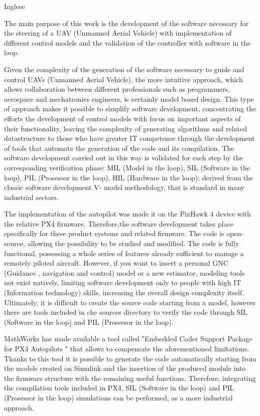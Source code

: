 \begin{commento}
Inglese

The main purpose of this work is the development of the software necessary for the steering of a UAV (Unmanned Aerial Vehicle) with implementation of different control models and  the validation of the controller with software in the loop.

Given the complexity of the generation of the software necessary to guide and control UAVs (Unmanned Aerial Vehicle), the more intuitive approach, which allows collaboration between different professionals such as programmers, aerospace and mechatronics engineers, is certainly model based design. This type of approach makes it possible to simplify software development, concentrating the efforts the development of control models with focus on important aspects of their functionality, leaving the complexity of generating algorithms and related datastructure to those who have greater IT competence through the development of tools that automate the generation of the code and its compilation.
The software development carried out in this way is validated for each step by the corresponding verification phase: MIL (Model in the loop), SIL (Software in the loop), PIL (Prosessor in the loop), HIL (Hardware in the loop); derived from the classic software development V- model methodology, that is standard in many industrial sectors.

The implementation of the autopilot was made it on the PixHawk 4 device with the relative PX4 firmware. Therefore,the software development takes place specifically for these product systems and related firmware. The code is open-source, allowing the possibility to be studied and modified. The code is fully functional, possessing a whole series of features already sufficient to manage a remotely piloted aircraft. However, if you want to insert a personal GNC (Guidance , navigation and control) model or a new estimator, modeling tools not exist natively, limiting software development only to people with high IT (Information technology) skills, increasing the  overall design complexity itself. Ultimately, it is difficult to create the source code starting from a model, however there are tools included in che sources directory to verify the code through SIL (Software in the loop) and PIL (Prosessor in the loop).

MathWorks has made available a tool called "Embedded Coder Support Package
for PX4 Autopilots " that allows to compensate the aforementioned limitations. Thanks to this tool it is possible to generate the code automatically starting from the models created on Simulink and the insertion of the produced module into the firmware structure with the remaining useful functions. Therefore, integrating the compilation tools included in PX4, SIL (Software in the loop) and PIL (Prosessor in the loop) simulations can be performed, as a more industrial approach.


\end{commento}
